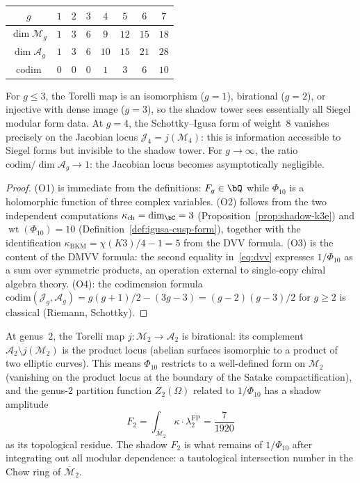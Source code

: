 \begin{theorem}
\begin{enumerate}[label=\textup{(O\arabic*)}]
\begin{center}
\begin{tabular}{cccccccc}
$g$ & $1$ & $2$ & $3$ & $4$ & $5$ & $6$ & $7$ \\
\hline
$\dim \mathcal{M}_g$ & $1$ & $3$ & $6$ & $9$ & $12$ & $15$ & $18$ \\
$\dim \mathcal{A}_g$ & $1$ & $3$ & $6$ & $10$ & $15$ & $21$ & $28$ \\
$\mathrm{codim}$ & $0$ & $0$ & $0$ & $1$ & $3$ & $6$ & $10$
\end{tabular}
\end{center}
For $g \leq 3$, the Torelli map is an isomorphism
($g = 1$), birational ($g = 2$), or injective with dense
image ($g = 3$), so the shadow tower sees essentially all
Siegel modular form data. At $g = 4$, the Schottky--Igusa
form of weight~$8$ vanishes precisely on the Jacobian locus
$\mathcal{J}_4 = j(\mathcal{M}_4)$: this is information
accessible to Siegel forms but invisible to the shadow tower.
For $g \to \infty$, the ratio
$\mathrm{codim}/\dim\mathcal{A}_g \to 1$: the Jacobian
locus becomes asymptotically negligible.
\end{enumerate}
\end{theorem}

\begin{proof}
(O1) is immediate from the definitions: $F_g \in \bQ$ while
$\Phi_{10}$ is a holomorphic function of three complex variables.
(O2) follows from the two independent computations
$\kappa_{\mathrm{ch}} = \dim_\bC = 3$
(Proposition~\ref{prop:shadow-k3e}) and
$\operatorname{wt}(\Phi_{10}) = 10$
(Definition~\ref{def:igusa-cusp-form}), together with the
identification $\kappa_{\mathrm{BKM}} = \chi(K3)/4 - 1 = 5$
from the DVV formula.
(O3) is the content of the DMVV formula: the
second equality in~\eqref{eq:dvv} expresses $1/\Phi_{10}$
as a sum over symmetric products, an operation external to
single-copy chiral algebra theory.
(O4): the codimension formula
$\mathrm{codim}(\mathcal{J}_g, \mathcal{A}_g)
= g(g+1)/2 - (3g-3) = (g-2)(g-3)/2$ for $g \geq 2$ is
classical (Riemann, Schottky).
\end{proof}

\begin{remark}
\label{rem:torelli-bridge}
At genus~$2$, the Torelli map
$j\colon \mathcal{M}_2 \to \mathcal{A}_2$ is birational:
its complement $\mathcal{A}_2 \setminus j(\mathcal{M}_2)$
is the product locus (abelian surfaces isomorphic to a
product of two elliptic curves). This means $\Phi_{10}$
restricts to a well-defined form on $\mathcal{M}_2$
(vanishing on the product locus at the boundary of the
Satake compactification), and the genus-$2$ partition
function $Z_2(\Omega)$ related to $1/\Phi_{10}$ has a
shadow amplitude
\[
F_2 = \int_{\overline{\mathcal{M}}_2} \kappa \cdot
\lambda_2^{\mathrm{FP}} = \frac{7}{1920}
\]
as its topological residue. The shadow $F_2$ is what
remains of $1/\Phi_{10}$ after integrating out all modular
dependence: a tautological intersection number in the
Chow ring of $\overline{\mathcal{M}}_2$.
\end{remark}

